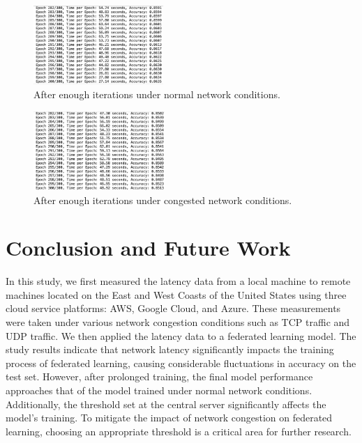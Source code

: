\documentclass[conference]{IEEEtran}
\begin{document}
\begin{figure}[!ht]
    \centering
    \includegraphics[width=0.6\linewidth, height=3cm]{no_latency_enough_epoch.png}
    \caption{After enough iterations under normal network conditions.}
    \label{fig:no_latency} 
\end{figure}

\begin{figure}[!ht]
    \centering
    \includegraphics[width=0.6\linewidth, height=3cm]{latency_enough_epoch.png}
    \caption{After enough iterations under congested network conditions.}
    \label{fig:latency}
\end{figure}

\FloatBarrier

\section{Conclusion and Future Work}

In this study, we first measured the latency data from a local machine to remote machines located on the East and West Coasts of the United States using three cloud service platforms: AWS, Google Cloud, and Azure. These measurements were taken under various network congestion conditions such as TCP traffic and UDP traffic. We then applied the latency data to a federated learning model. The study results indicate that network latency significantly impacts the training process of federated learning, causing considerable fluctuations in accuracy on the test set. However, after prolonged training, the final model performance approaches that of the model trained under normal network conditions. Additionally, the threshold set at the central server significantly affects the model's training. To mitigate the impact of network congestion on federated learning, choosing an appropriate threshold is a critical area for further research.
\end{document}
